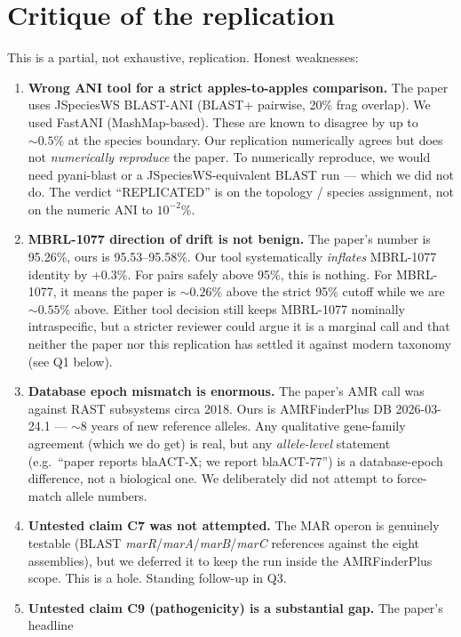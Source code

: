 \documentclass[11pt]{article}
\begin{document}
\section{Critique of the replication}
\label{sec:critique}
This is a partial, not exhaustive, replication. Honest weaknesses:

\begin{enumerate}[leftmargin=*]
\item \textbf{Wrong ANI tool for a strict apples-to-apples comparison.} The paper uses
    JSpeciesWS BLAST-ANI (BLAST+ pairwise, 20\% frag overlap). We used FastANI (MashMap-based).
    These are known to disagree by up to $\sim 0.5\%$ at the species boundary. Our replication
    numerically agrees but does not \emph{numerically reproduce} the paper. To numerically
    reproduce, we would need pyani-blast or a JSpeciesWS-equivalent BLAST run --- which we
    did not do. The verdict ``REPLICATED'' is on the topology / species assignment, not on
    the numeric ANI to $10^{-2}\%$.
\item \textbf{MBRL-1077 direction of drift is not benign.} The paper's number is 95.26\%,
    ours is 95.53--95.58\%. Our tool systematically \emph{inflates} MBRL-1077 identity by
    +0.3\%. For pairs safely above 95\%, this is nothing. For MBRL-1077, it means the paper
    is $\sim 0.26\%$ above the strict 95\% cutoff while we are $\sim 0.55\%$ above. Either
    tool decision still keeps MBRL-1077 nominally intraspecific, but a stricter reviewer
    could argue it is a marginal call and that neither the paper nor this replication has
    settled it against modern taxonomy (see Q1 below).
\item \textbf{Database epoch mismatch is enormous.} The paper's AMR call was against RAST
    subsystems circa 2018. Ours is AMRFinderPlus DB 2026-03-24.1 --- $\sim 8$ years of new
    reference alleles. Any qualitative gene-family agreement (which we do get) is real, but
    any \emph{allele-level} statement (e.g.\ ``paper reports blaACT-X; we report blaACT-77'')
    is a database-epoch difference, not a biological one. We deliberately did not attempt
    to force-match allele numbers.
\item \textbf{Untested claim C7 was not attempted.} The MAR operon is genuinely testable
    (BLAST \emph{marR}/\emph{marA}/\emph{marB}/\emph{marC} references against the eight
    assemblies), but we deferred it to keep the run inside the AMRFinderPlus scope. This
    is a hole. Standing follow-up in Q3.
\item \textbf{Untested claim C9 (pathogenicity) is a substantial gap.} The paper's headline

\end{enumerate}
\end{document}
